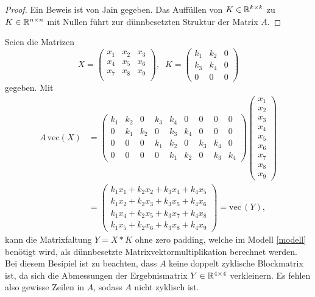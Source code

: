 \begin{proof}
    Ein Beweis ist von Jain \cite{jain1989fundamentals} gegeben. Das Auffüllen von $K \in \mathbb{R}^{k \times k}$ zu $K \in \mathbb{R}^{n \times n}$ mit Nullen führt zur dünnbesetzten Struktur der Matrix $A$. 
\end{proof}
\begin{bsp}
    \label{bsp:Kzeropad}
    Seien die Matrizen
    \begin{equation*}
        X=\begin{pmatrix}
            x_1 & x_2 &x_3 \\
            x_4 & x_5 &x_6 \\
            x_7 & x_8 &x_9 \\
        \end{pmatrix}, \; \;
        K=\begin{pmatrix}
            k_1 & k_2 &0\\
            k_3 &k_4 &0 \\
            0 &0 &0
        \end{pmatrix}
    \end{equation*}
    gegeben. Mit 
    \begin{align*}
    A \, \mathrm{vec}(X) &=    
    \begin{pmatrix}
        k_1 & k_2 & 0 &k_3 &k_4 &0 &0 &0 &0 \\
        0 & k_1 & k_2 &0 &k_3 &k_4 &0 &0 &0 \\
        0 & 0 & 0 &k_1 &k_2 &0 &k_3 &k_4 &0 \\
        0 & 0 & 0 &0 &k_1 &k_2 &0 &k_3 &k_4 
    \end{pmatrix}
    \begin{pmatrix}
        x_1 \\
        x_2 \\
        x_3 \\
        x_4 \\
        x_5 \\
        x_6 \\
        x_7 \\
        x_8 \\
        x_9
    \end{pmatrix} \\
    &=\begin{pmatrix}
        k_1 x_1+ k_2 x_2 +k_3 x_4 +k_4 x_5 \\
        k_1 x_2+ k_2 x_3 +k_3 x_5 +k_4 x_6 \\
        k_1 x_4+ k_2 x_5 +k_3 x_7 +k_4 x_8 \\
        k_1 x_5+ k_2 x_6 +k_3 x_8 +k_4 x_9 
    \end{pmatrix}=\mathrm{vec} \, (Y),
\end{align*}
kann die Matrixfaltung $Y = X \ast K$ ohne zero padding, welche im Modell \ref{modell} benötigt wird, als dünnbesetzte Matrixvektormultiplikation berechnet werden. Bei diesem Besipiel ist zu beachten, dass $A$ keine doppelt zyklische Blockmatrix ist, da sich die Abmessungen der Ergebnismatrix $ Y \in \mathbb{R}^{ 4 \times 4}$ verkleinern. Es fehlen also gewisse Zeilen in $A$, sodass $A$ nicht zyklisch ist.
\end{bsp}
